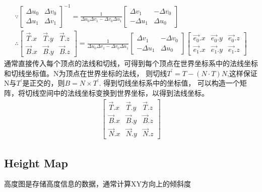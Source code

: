 \begin{gather*}
    \because  \begin{bmatrix}
        \Delta u_{0} & \Delta v_{0} \\ 
        \Delta u_{1} & \Delta v_{1}
    \end{bmatrix}^{-1} = \frac{1}{\Delta u_{0} \Delta v_{1} - \Delta v_{0} \Delta u_{1}} \begin{bmatrix}
        \Delta v_{1} & -\Delta v_{0} \\ 
        -\Delta u_{1} & \Delta u_{0}
    \end{bmatrix} \\ 
    \therefore \begin{bmatrix}
        \overrightarrow{T}.x & \overrightarrow{T}.y & \overrightarrow{T}.z \\ 
        \overrightarrow{B}.x & \overrightarrow{B}.y & \overrightarrow{B}.z  
    \end{bmatrix} = \frac{1}{\Delta u_{0} \Delta v_{1} - \Delta v_{0} \Delta u_{1}} \begin{bmatrix}
        \Delta v_{1} & -\Delta v_{0} \\ 
        -\Delta u_{1} & \Delta u_{0}
    \end{bmatrix} \begin{bmatrix}
        \overrightarrow{e_{0}}.x & \overrightarrow{e_{0}}.y & \overrightarrow{e_{0}}.z \\ 
        \overrightarrow{e_{1}}.x & \overrightarrow{e_{1}}.y & \overrightarrow{e_{1}}.z  
    \end{bmatrix} 
\end{gather*}
通常直接传入每个顶点的法线和切线，可得到每个顶点在世界坐标系中的法线坐标和切线坐标值。N为顶点在世界坐标的法线，
则切线$T^{'} = T - (N \cdot T)N $,这样保证N与$ T^{'} $是正交的，则$B=N \times T^{'}$. 得到切线坐标系中的坐标值，
可以构造一个矩阵，将切线空间中的法线坐标变换到世界坐标，以得到法线坐标。
\begin{gather*}
    \begin{bmatrix}
        \overrightarrow{T}.x & \overrightarrow{T}.y & \overrightarrow{T}.z \\ 
        \overrightarrow{B}.x & \overrightarrow{B}.y & \overrightarrow{B}.z \\ 
        \overrightarrow{N}.x & \overrightarrow{N}.y & \overrightarrow{N}.z 
    \end{bmatrix}
\end{gather*}

\subsection{Height Map}
高度图是存储高度信息的数据，通常计算XY方向上的倾斜度

